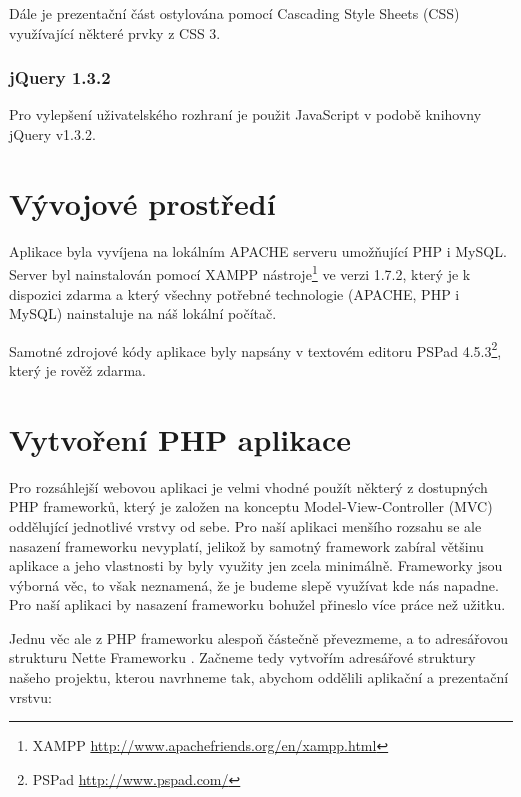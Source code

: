 Dále je prezentační část ostylována pomocí Cascading Style Sheets (CSS) využívající některé prvky z CSS 3.

\subsubsection{jQuery 1.3.2}

Pro vylepšení uživatelského rozhraní je použit JavaScript v podobě knihovny jQuery v1.3.2.


\section{Vývojové prostředí}

Aplikace byla vyvíjena na lokálním APACHE serveru umožňující PHP i MySQL. Server byl nainstalován pomocí XAMPP nástroje\footnote{XAMPP \url{http://www.apachefriends.org/en/xampp.html}} ve verzi 1.7.2, který je k dispozici zdarma a který všechny potřebné technologie (APACHE, PHP i MySQL) nainstaluje na náš lokální počítač.

Samotné zdrojové kódy aplikace byly napsány v textovém editoru PSPad 4.5.3\footnote{PSPad \url{http://www.pspad.com/}}, který je rověž zdarma.


\section{Vytvoření PHP aplikace}

Pro rozsáhlejší webovou aplikaci je velmi vhodné použít některý z dostupných PHP frameworků, který je založen na konceptu Model-View-Controller (MVC) oddělující jednotlivé vrstvy od sebe.
Pro naší aplikaci menšího rozsahu se ale nasazení frameworku nevyplatí, jelikož by samotný framework zabíral většinu aplikace a jeho vlastnosti by byly využity jen zcela minimálně.
Frameworky jsou výborná věc, to však neznamená, že je budeme slepě využívat kde nás napadne. Pro naší aplikaci by nasazení frameworku bohužel přineslo více práce než užitku.

Jednu věc ale z PHP frameworku alespoň částečně převezmeme, a to adresářovou strukturu Nette Frameworku \cite{nette}.
Začneme tedy vytvořím adresářové struktury našeho projektu, kterou navrhneme tak, abychom oddělili aplikační a prezentační vrstvu:

